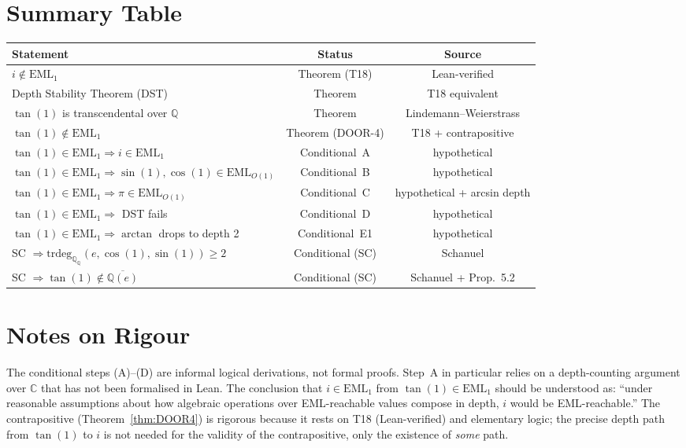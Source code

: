 \documentclass[11pt]{article}
\newcommand{\EML}[1]{\mathrm{EML}_{#1}}
\newcommand{\trdeg}{\mathrm{trdeg}_{\mathbb{Q}}}
\begin{document}
\section{Summary Table}

\begin{center}
\begin{tabular}{p{5cm}cc}
\hline
\textbf{Statement} & \textbf{Status} & \textbf{Source} \\
\hline
$i \notin \EML{1}$ & Theorem (T18) & Lean-verified \\
Depth Stability Theorem (DST) & Theorem & T18 equivalent \\
$\tan(1)$ is transcendental over $\mathbb{Q}$ & Theorem & Lindemann--Weierstrass \\
$\tan(1) \notin \EML{1}$ & Theorem (DOOR-4) & T18 + contrapositive \\
\hline
$\tan(1) \in \EML{1} \Rightarrow i \in \EML{1}$ & Conditional~A & hypothetical \\
$\tan(1) \in \EML{1} \Rightarrow \sin(1),\cos(1) \in \EML{O(1)}$ & Conditional~B & hypothetical \\
$\tan(1) \in \EML{1} \Rightarrow \pi \in \EML{O(1)}$ & Conditional~C & hypothetical + arcsin depth \\
$\tan(1) \in \EML{1} \Rightarrow$ DST fails & Conditional~D & hypothetical \\
$\tan(1) \in \EML{1} \Rightarrow \arctan$ drops to depth 2 & Conditional~E1 & hypothetical \\
\hline
SC $\Rightarrow \trdeg_{\mathbb{Q}}(e,\cos(1),\sin(1)) \geq 2$ & Conditional (SC) & Schanuel \\
SC $\Rightarrow \tan(1) \notin \overline{\mathbb{Q}(e)}$ & Conditional (SC) & Schanuel + Prop.~5.2 \\
\hline
\end{tabular}
\end{center}

\section*{Notes on Rigour}

The conditional steps (A)–(D) are informal logical derivations, not formal
proofs.  Step~A in particular relies on a depth-counting argument over
$\mathbb{C}$ that has not been formalised in Lean.  The conclusion that
$i \in \EML{1}$ from $\tan(1) \in \EML{1}$ should be understood as: ``under
reasonable assumptions about how algebraic operations over EML-reachable
values compose in depth, $i$ would be EML-reachable.''  The contrapositive
(Theorem~\ref{thm:DOOR4}) is rigorous because it rests on T18 (Lean-verified)
and elementary logic; the precise depth path from $\tan(1)$ to $i$ is not
needed for the validity of the contrapositive, only the existence of \emph{some}
path.
\end{document}

